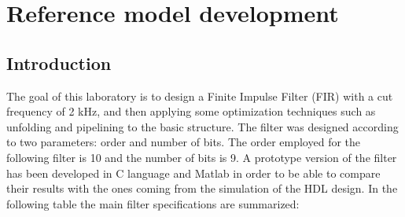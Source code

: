 %

\chapter{Reference model development}
\label{chap1}
\graphicspath{ {./chapters/chap1images/} }
\section{Introduction}

The goal of this laboratory is to design a Finite Impulse Filter (FIR) with a cut frequency of 2 kHz, and then applying some optimization 
techniques such as unfolding and pipelining to the basic structure.
The filter was designed according to two parameters: order and number of bits. The order employed for the following filter
is 10 and the number of bits is 9.
A prototype version of the filter has been developed in C language and Matlab in order to be able to compare their results with the
ones coming from the simulation of the HDL design.
In the following table the main filter specifications are summarized:

%

